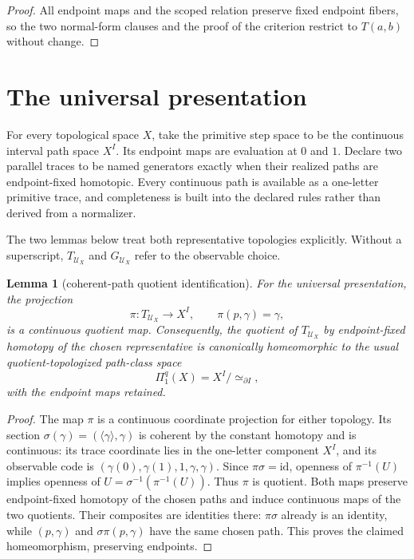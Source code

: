 \documentclass[10pt,reqno]{amsart}
\theoremstyle{definition}
\theoremstyle{plain}
\newtheorem{lemma}[definition]{Lemma}
\theoremstyle{remark}
\begin{document}
\begin{proof}
All endpoint maps and the scoped relation preserve fixed endpoint fibers, so
the two normal-form clauses and the proof of the criterion restrict to
$T(a,b)$ without change.
\end{proof}

\section{The universal presentation}
\label{sec:universal}

For every topological space $X$, take the primitive step space to be the
continuous interval path space $X^I$.  Its endpoint maps are evaluation at
$0$ and $1$.  Declare two parallel traces to be named generators exactly when
their realized paths are endpoint-fixed homotopic.
Every continuous path is available as a one-letter primitive trace, and
completeness is built into the declared rules rather than derived from a
normalizer.

The two lemmas below treat both representative topologies explicitly.
Without a superscript, $T_{\mathcal U_X}$ and $G_{\mathcal U_X}$ refer to the
observable choice.

\begin{lemma}[coherent-path quotient identification]
\label{lem:coherent-path-quotient-identification}
For the universal presentation, the projection
\[
  \pi:T_{\mathcal U_X}\longrightarrow X^I,
  \qquad \pi(p,\gamma)=\gamma,
\]
is a continuous quotient map.  Consequently, the quotient of
$T_{\mathcal U_X}$ by endpoint-fixed homotopy of the chosen representative is
canonically homeomorphic to the usual quotient-topologized path-class space
\[
  \Pi_1^q(X)=X^I/{\simeq_{\partial I}},
\]
with the endpoint maps retained.
\end{lemma}

\begin{proof}
The map $\pi$ is a continuous coordinate projection for either topology.
Its section $\sigma(\gamma)=(\langle\gamma\rangle,\gamma)$ is coherent
by the constant homotopy and is continuous: its trace coordinate lies in
the one-letter component $X^I$, and its observable code is
$(\gamma(0),\gamma(1),1,\gamma,\gamma)$.
Since $\pi\sigma=\mathrm{id}$, openness of $\pi^{-1}(U)$ implies
openness of $U=\sigma^{-1}(\pi^{-1}(U))$. Thus $\pi$ is quotient.
Both maps preserve endpoint-fixed homotopy of the chosen paths and
induce continuous maps of the two quotients. Their composites are
identities there: $\pi\sigma$ already is an identity, while
$(p,\gamma)$ and $\sigma\pi(p,\gamma)$ have the same chosen path.
This proves the claimed homeomorphism, preserving endpoints.
\end{proof}
\end{document}
